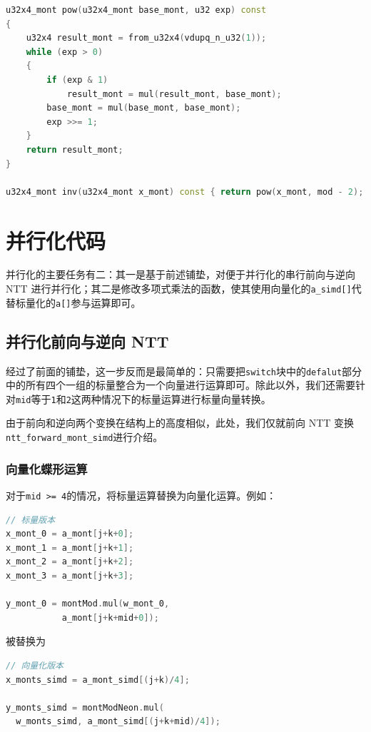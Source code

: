 \documentclass[a4paper]{article}
\begin{document}
\begin{lstlisting}[language=C++]
u32x4_mont pow(u32x4_mont base_mont, u32 exp) const
{
    u32x4 result_mont = from_u32x4(vdupq_n_u32(1));
    while (exp > 0)
    {
        if (exp & 1)
            result_mont = mul(result_mont, base_mont);
        base_mont = mul(base_mont, base_mont);
        exp >>= 1;
    }
    return result_mont;
}

u32x4_mont inv(u32x4_mont x_mont) const { return pow(x_mont, mod - 2); }
\end{lstlisting}

\section{并行化代码}

并行化的主要任务有二：其一是基于前述铺垫，对便于并行化的串行前向与逆向 NTT 进行并行化；其二是修改多项式乘法的函数，使其使用向量化的\texttt{a\_simd[]}代替标量化的\texttt{a[]}参与运算即可。

\subsection{并行化前向与逆向 NTT}

经过了前面的铺垫，这一步反而是最简单的：只需要把\texttt{switch}块中的\texttt{defalut}部分中的所有四个一组的标量整合为一个向量进行运算即可。除此以外，我们还需要针对\texttt{mid}等于\texttt{1}和\texttt{2}这两种情况下的标量运算进行标量向量转换。

由于前向和逆向两个变换在结构上的高度相似，此处，我们仅就前向 NTT 变换\texttt{ntt\_forward\_mont\_simd}进行介绍。

\subsubsection{向量化蝶形运算}

对于\texttt{mid >= 4}的情况，将标量运算替换为向量化运算。例如：

\begin{lstlisting}[language=C++]
// 标量版本
x_mont_0 = a_mont[j+k+0];
x_mont_1 = a_mont[j+k+1];
x_mont_2 = a_mont[j+k+2];
x_mont_3 = a_mont[j+k+3];

y_mont_0 = montMod.mul(w_mont_0,
           a_mont[j+k+mid+0]);
\end{lstlisting}

被替换为

\begin{lstlisting}[language=C++]
// 向量化版本
x_monts_simd = a_mont_simd[(j+k)/4];

y_monts_simd = montModNeon.mul(
  w_monts_simd, a_mont_simd[(j+k+mid)/4]);
\end{lstlisting}
\end{document}
